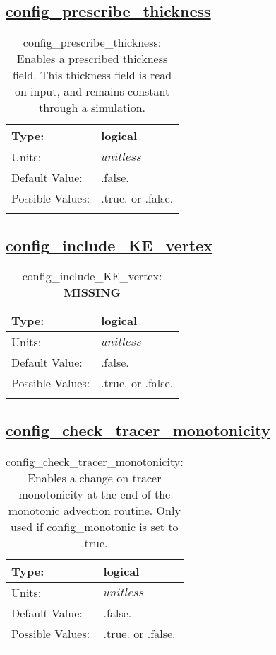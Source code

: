 \subsection[config\_prescribe\_thickness]{\hyperref[sec:nm_tab_debug]{config\_prescribe\_thickness}}
\label{subsec:nm_sec_config_prescribe_thickness}
\begin{center}
\begin{longtable}{| p{2.0in} | p{4.0in} |}
    \hline
    Type: & logical \\
    \hline
    Units: & $unitless$ \\
    \hline
    Default Value: & .false. \\
    \hline
    Possible Values: & .true. or .false. \\
    \hline
    \caption{config\_prescribe\_thickness: Enables a prescribed thickness field. This thickness field is read on input, and remains constant through a simulation.}
\end{longtable}
\end{center}
\subsection[config\_include\_KE\_vertex]{\hyperref[sec:nm_tab_debug]{config\_include\_KE\_vertex}}
\label{subsec:nm_sec_config_include_KE_vertex}
\begin{center}
\begin{longtable}{| p{2.0in} | p{4.0in} |}
    \hline
    Type: & logical \\
    \hline
    Units: & $unitless$ \\
    \hline
    Default Value: & .false. \\
    \hline
    Possible Values: & .true. or .false. \\
    \hline
    \caption{config\_include\_KE\_vertex: {\bf \color{red} MISSING}}
\end{longtable}
\end{center}
\subsection[config\_check\_tracer\_monotonicity]{\hyperref[sec:nm_tab_debug]{config\_check\_tracer\_monotonicity}}
\label{subsec:nm_sec_config_check_tracer_monotonicity}
\begin{center}
\begin{longtable}{| p{2.0in} | p{4.0in} |}
    \hline
    Type: & logical \\
    \hline
    Units: & $unitless$ \\
    \hline
    Default Value: & .false. \\
    \hline
    Possible Values: & .true. or .false. \\
    \hline
    \caption{config\_check\_tracer\_monotonicity: Enables a change on tracer monotonicity at the end of the monotonic advection routine. Only used if config\_monotonic is set to .true.}
\end{longtable}
\end{center}
